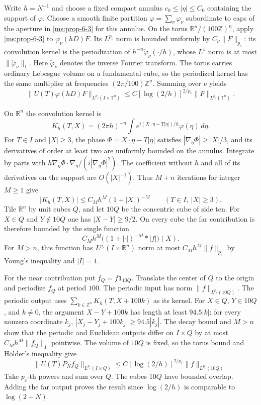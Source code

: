Write \(h=N^{-1}\) and choose a fixed compact annulus
\(c_0\le|\eta|\le C_0\) containing the support of \(\varphi\).
Choose a smooth finite partition \(\varphi=\sum_\nu\varphi_\nu\)
subordinate to caps of the aperture in \ref{ms:prop-6-3} for this
annulus. On the torus \(\mathbb R^n/(100\mathbb Z)^n\), apply
\ref{ms:prop-6-3} to \(\varphi_\nu(hD)F\). Its \(L^{p_c}\) norm is
bounded uniformly by \(C_\nu\|F\|_{p_c}\): its convolution kernel
is the periodization of \(h^{-n}\check\varphi_\nu(\cdot/h)\),
whose \(L^1\) norm is at most \(\|\check\varphi_\nu\|_1\).
Here \(\check\varphi_\nu\) denotes the inverse Fourier transform.
The torus carries ordinary Lebesgue volume on a fundamental cube,
so the periodized kernel has the same multiplier at frequencies
\((2\pi/100)\mathbb Z^n\). Summing over \(\nu\) yields
\[
 \|U(T)\varphi(hD)F\|_{L^{p_c}(I\times\mathbb T^n)}
 \le C[\log(2/h)]^{2/p_c}\|F\|_{L^{p_c}(\mathbb T^n)}.
\]

On \(\mathbb R^n\) the convolution kernel is
\[
 K_h(T,X)=(2\pi h)^{-n}
   \int e^{i(X\cdot\eta-T|\eta|)/h}\varphi(\eta)\,d\eta .
\]
For \(T\in I\) and \(|X|\ge3\), the phase \(\Phi=X\cdot\eta-T|\eta|\)
satisfies \(|\nabla_\eta\Phi|\ge |X|/3\), and its derivatives of
order at least two are uniformly bounded on the annulus. Integrate
by parts with \(h\nabla_\eta\Phi\cdot\nabla_\eta/(i|\nabla_\eta\Phi|^2)\).
The coefficient without \(h\) and all of its derivatives on the
support are \(O(|X|^{-1})\). Thus \(M+n\) iterations for integer
\(M\ge1\) give
\[
 |K_h(T,X)|\le C_M h^M(1+|X|)^{-M}
 \qquad (T\in I,\ |X|\ge3).
\]
Tile \(\mathbb R^n\) by unit cubes \(Q\), and let \(10Q\) be the
concentric cube of side ten. For \(X\in Q\) and \(Y\notin 10Q\)
one has \(|X-Y|\ge9/2\). On every cube the far contribution is
therefore bounded by the single function
\[
 C_M h^M\big((1+|\cdot|)^{-M}*|f|\big)(X).
\]
For \(M>n\), this function has \(L^{p_c}(I\times\mathbb R^n)\)
norm at most \(C_M h^M\|f\|_{p_c}\) by Young's inequality and
\(|I|=1\).

For the near contribution put \(f_Q=f\mathbf 1_{10Q}\). Translate the
center of \(Q\) to the origin and periodize \(f_Q\) at period \(100\).
The periodic input has norm \(\|f\|_{L^{p_c}(10Q)}\). The periodic
output uses \(\sum_{k\in\mathbb Z^n}K_h(T,X+100k)\) as its kernel.
For \(X\in Q\), \(Y\in 10Q\), and \(k\ne0\), the argument
\(X-Y+100k\) has length at least \(94.5|k|\): for every nonzero
coordinate \(k_j\), \(|X_j-Y_j+100k_j|\ge 94.5 |k_j|\).
The decay bound and \(M>n\) show that the periodic and Euclidean
outputs differ on \(I\times Q\) by at most
\(C_M h^M\|f_Q\|_1\) pointwise. The volume of \(10Q\) is fixed, so
the torus bound and Hölder's inequality give
\[
 \|U(T)P_Nf_Q\|_{L^{p_c}(I\times Q)}
 \le C[\log(2/h)]^{2/p_c}\|f\|_{L^{p_c}(10Q)}.
\]
Take \(p_c\)-th powers and sum over \(Q\). The cubes \(10Q\) have
bounded overlap. Adding the far output proves the result since
\(\log(2/h)\) is comparable to \(\log(2+N)\).
